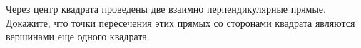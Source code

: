\begin{ex}
	\begin{condition}
		Через центр квадрата проведены две взаимно перпендикулярные прямые. Докажите, что точки пересечения этих прямых со сторонами квадрата являются вершинами еще одного	квадрата.
	\end{condition}
\end{ex}